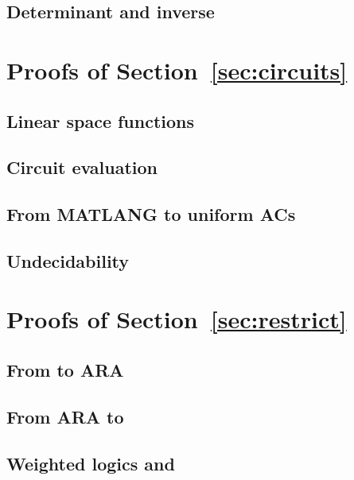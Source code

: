 \subsection{Determinant and inverse}\label{app:inverse}



\section{Proofs of Section~\ref{sec:circuits}}

% 

\subsection{Linear space functions}


\subsection{Circuit evaluation}


\subsection{From MATLANG to uniform ACs}


\subsection{Undecidability}



\section{Proofs of Section~\ref{sec:restrict}}

\subsection{From \langsum to ARA}


\subsection{From ARA to \langsum}


% 

% 

\subsection{Weighted logics and \langprod}


